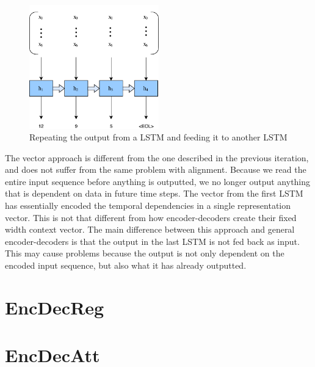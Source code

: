 \begin{figure}[ht]
    \centering
    \includegraphics[width=0.5\textwidth]{fig/development_process/lstm-vector-projection-decoder.pdf}
    \caption{Repeating the output from a LSTM and feeding it to another LSTM}
    \label{fig:lstm-vector-projection-decoder}
\end{figure}

The vector approach is different from the one described in the previous iteration, and does not suffer from the same problem with alignment. Because we read the entire input sequence before anything is outputted, we no longer output anything that is dependent on data in future time steps. The vector from the first LSTM has essentially encoded the temporal dependencies in a single representation vector. This is not that different from how encoder-decoders create their fixed width context vector. The main difference between this approach and general encoder-decoders is that the output in the last LSTM is not fed back as input. This may cause problems because the output is not only dependent on the encoded input sequence, but also what it has already outputted.


\section{EncDecReg}


\section{EncDecAtt}
